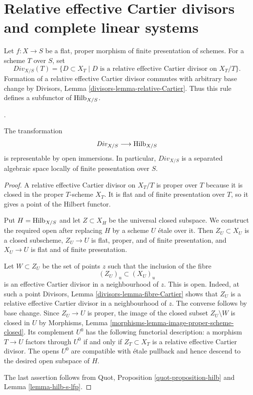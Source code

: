 \section{Relative effective Cartier divisors and complete linear systems}
\label{section-relative-effective-Cartier-divisors}

\noindent
Let $f : X \to S$ be a flat, proper morphism of finite presentation of
schemes. For a scheme $T$ over $S$, set
$$
\mathit{Div}_{X/S}(T) =
\{D \subset X_T \mid D\text{ is a relative effective Cartier divisor
on }X_T/T\}.
$$
Formation of a relative effective Cartier divisor commutes with arbitrary
base change by Divisors, Lemma
\ref{divisors-lemma-relative-Cartier}. Thus this rule defines a subfunctor of
$\mathrm{Hilb}_{X/S}$.

\begin{lemma}
\label{lemma-divisors-open-in-hilbert}
\begin{reference}
\cite[Expos\'e 232, Section 4, pp. 150--152]{FGA}.
\end{reference}
The transformation
$$
\mathit{Div}_{X/S} \longrightarrow \mathrm{Hilb}_{X/S}
$$
is representable by open immersions. In particular,
$\mathit{Div}_{X/S}$ is a separated algebraic space locally of finite
presentation over $S$.
\end{lemma}

\begin{proof}
A relative effective Cartier divisor on $X_T/T$ is proper over $T$ because
it is closed in the proper $T$-scheme $X_T$. It is flat and of finite
presentation over $T$, so it gives a point of the Hilbert functor.

Put $H = \mathrm{Hilb}_{X/S}$ and let $Z \subset X_H$ be the universal
closed subspace. We construct the required open after replacing $H$ by a
scheme $U$ \'etale over it. Then $Z_U \subset X_U$ is a closed subscheme,
$Z_U \to U$ is flat, proper, and of finite presentation, and
$X_U \to U$ is flat and of finite presentation.

Let $W \subset Z_U$ be the set of points $z$ such that the inclusion of the
fibre
$$
(Z_U)_u \subset (X_U)_u
$$
is an effective Cartier divisor in a neighbourhood of $z$. This is open.
Indeed, at such a point Divisors, Lemma
\ref{divisors-lemma-fibre-Cartier} shows that $Z_U$ is a relative effective
Cartier divisor in a neighbourhood of $z$. The converse follows by base
change. Since $Z_U \to U$ is proper, the image of the closed subset
$Z_U \setminus W$ is closed in $U$ by Morphisms, Lemma
\ref{morphisms-lemma-image-proper-scheme-closed}. Its complement $U^0$ has
the following functorial description: a morphism $T \to U$ factors through
$U^0$ if and only if $Z_T \subset X_T$ is a relative effective Cartier
divisor. The opens $U^0$ are compatible with \'etale pullback and hence
descend to the desired open subspace of $H$.

The last assertion follows from Quot, Proposition
\ref{quot-proposition-hilb} and Lemma \ref{lemma-hilb-s-lfp}.
\end{proof}

